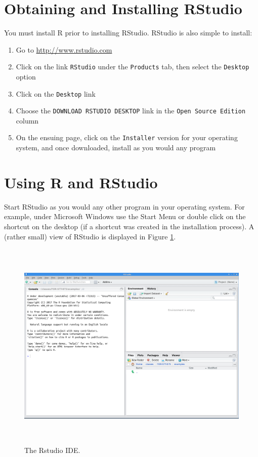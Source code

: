 \documentclass[]{krantz}
\providecommand{\tightlist}{%
  \setlength{\itemsep}{0pt}\setlength{\parskip}{0pt}}
\theoremstyle{definition}
\theoremstyle{definition}
\theoremstyle{definition}
\theoremstyle{remark}
\begin{document}
\section{Obtaining and Installing
RStudio}\label{obtaining-and-installing-rstudio}

You must install R prior to installing RStudio. RStudio is also simple
to install:

\begin{enumerate}
\def\labelenumi{\arabic{enumi}.}
\tightlist
\item
  Go to \url{http://www.rstudio.com}
\item
  Click on the link \texttt{RStudio} under the \texttt{Products} tab,
  then select the \texttt{Desktop} option
\item
  Click on the \texttt{Desktop} link
\item
  Choose the \texttt{DOWNLOAD\ RSTUDIO\ DESKTOP} link in the
  \texttt{Open\ Source\ Edition} column
\item
  On the ensuing page, click on the \texttt{Installer} version for your
  operating system, and once downloaded, install as you would any
  program
\end{enumerate}

\section{Using R and RStudio}\label{using-r-and-rstudio}

Start RStudio as you would any other program in your operating system.
For example, under Microsoft Windows use the Start Menu or double click
on the shortcut on the desktop (if a shortcut was created in the
installation process). A (rather small) view of RStudio is displayed in
Figure \ref{fig:rstudio}.

\begin{figure}
\includegraphics[width=20.75in,height=4in]{02-introToR/02-images/RStudio} \caption{The Rstudio IDE.}\label{fig:rstudio}
\end{figure}
\end{document}
